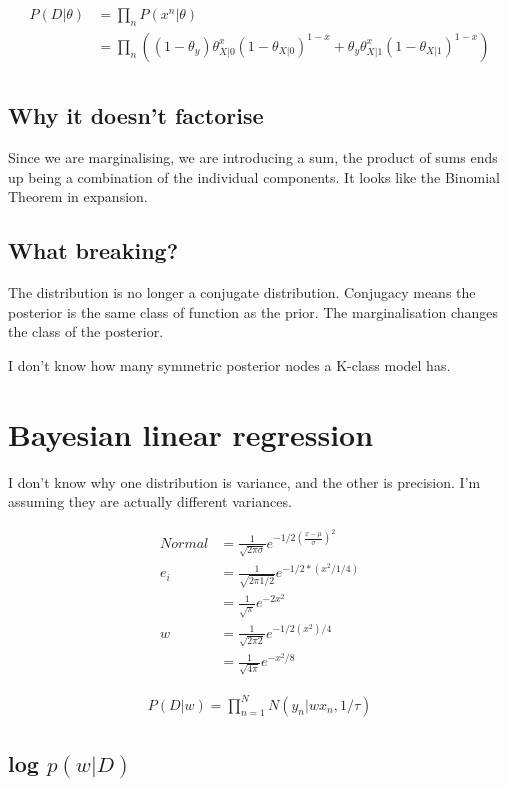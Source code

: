 \documentclass[11pt]{article}
\begin{document}
\begin{align}
	P(D|\theta) &= \prod_{n} P(x^n|\theta) \\
		&=  \prod_{n} ((1-\theta_y)\theta_{X|0}^x(1-\theta_{X|0})^{1-x} + \theta_y\theta_{X|1}^x(1-\theta_{X|1})^{1-x}) \\
\end{align}

\subsection{Why it doesn't factorise}

Since we are marginalising, we are introducing a sum, the product of sums ends up being a combination of the individual components. It looks like the Binomial Theorem in expansion.

\subsection{What breaking?}

The distribution is no longer a conjugate distribution. Conjugacy means the posterior is the same class of function as the prior. The marginalisation changes the class of the posterior.

I don't know how many symmetric posterior nodes a K-class model has.

\section{Bayesian linear regression}

I don't know why one distribution is variance, and the other is precision. I'm assuming they are actually different variances.


\begin{align}
	Normal &= \frac{1}{\sqrt{2 \pi \sigma}}e^{-1/2(\frac{x-\mu}{\sigma})^2}\\
	e_i &= \frac{1}{\sqrt{2 \pi 1/2}} e^{-1/2 * (x^2/1/4)} \\
	&= \frac{1}{\sqrt{\pi}}e^{{-2x^2}} \\
	w &= \frac{1}{\sqrt{2 \pi 2}} e^{-1/2 (x^2)/4} \\
	&= \frac{1}{\sqrt{4\pi}} e^{-x^2/8}
\end{align}

\begin{align}
	P(D|w) = \prod_{n=1}^{N} N(y_n | wx_n,  1/\tau)
\end{align}

\subsection{log $p(w|D)$}
\end{document}
